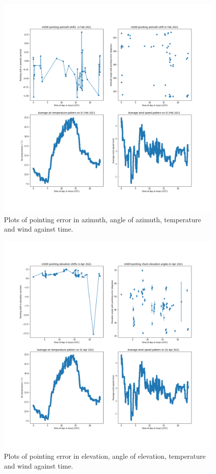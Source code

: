 \documentclass{article}
\begin{document}
\begin{figure}[H]
	\centering
	\includegraphics[scale=0.45]{m009_azim_Feb.png}
	
	\caption{Plots of pointing error in azimuth, angle of azimuth, temperature and wind against time.}
	\label{fig:m009AzimFeb}
\end{figure}


\begin{figure}[H]
	\centering
	\includegraphics[scale=0.45]{m009_elev_Mar.png}
	
	\caption{Plots of pointing error in elevation, angle of elevation, temperature and wind against time.}
	\label{fig:m009ElevMar}
\end{figure}
\end{document}
